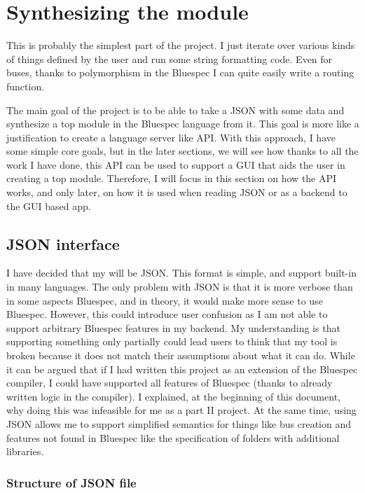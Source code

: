 \documentclass[12pt]{report}
\begin{document}
\section{Synthesizing the module}
This is probably the simplest part of the project. I just iterate over various kinds of things defined by the user and run some string formatting code. Even for buses, thanks to polymorphism in the Bluespec I can quite easily write a routing function. 
  
  
The main goal of the project is to be able to take a JSON with some data and synthesize a top module in the Bluespec language from it. This goal is more like a justification to create a language server like API. With this approach, I have some simple core goals, but in the later sections, we will see how thanks to all the work I have done, this API can be used to support a GUI that aids the user in creating a top module. Therefore, I will focus in this section on how the API works, and only later, on how it is used when reading JSON or as a backend to the GUI based app. 
  
  
\subsection{JSON interface}
I have decided that my  will be JSON. This format is simple, and support built-in in many languages.
The only problem with JSON is that it is more verbose than in some aspects Bluespec, and in theory, it would make more sense to use Bluespec.
However, this could introduce user confusion as I am not able to support arbitrary Bluespec features in my backend.
My understanding is that supporting something only partially could lead users to think that my tool is broken because it does not match their assumptions about what it can do.
While it can be argued that if I had written this project as an extension of the Bluespec compiler, I could have supported all features of Bluespec (thanks to already written logic in the compiler).
I explained, at the beginning of this document, why doing this was infeasible for me as a part II project.
At the same time, using JSON allows me to support simplified semantics for things like bus creation and features not found in Bluespec like the specification of folders with additional libraries.

\subsubsection{Structure of JSON file}
\end{document}
